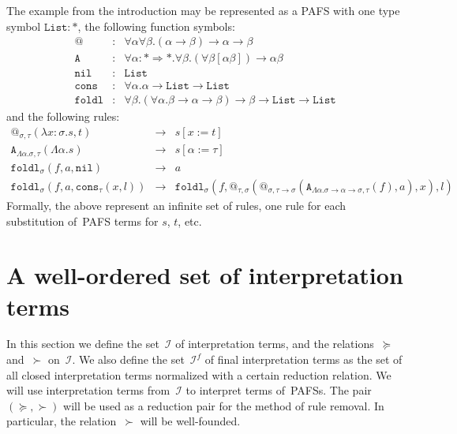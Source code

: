 \documentclass[a4paper,UKenglish,cleveref,autoref,numberwithinsect]{lipics-v2019}
\theoremstyle{definition}
\newcommand{\Iterms}{\mathcal{I}}
\newcommand{\arrkind}{\Rightarrow}
\newcommand{\arrtype}{\rightarrow}
\newcommand{\abs}[2]{\lambda #1.#2}
\newcommand{\tabs}[2]{\Lambda #1.#2}
\newcommand{\red}{\longrightarrow}
\newcommand{\List}{\mathtt{List}}
\newcommand{\nil}{\mathtt{nil}}
\newcommand{\cons}{\mathtt{cons}}
\begin{document}
\begin{example}\label{ex_fold_pafs}
  The example from the introduction may be represented as a PAFS with
  one type symbol $\mathtt{List} : *$, the following function symbols:
  \[
  \begin{array}{rcl}
    @ & : & \forall \alpha \forall \beta . (\alpha \arrtype \beta) \arrtype \alpha \arrtype \beta \\
    \mathtt{A} & : & \forall \alpha : * \arrkind * . \forall \beta .
    (\forall \beta [\alpha \beta]) \arrtype \alpha \beta \\
    \mathtt{nil} & : & \List \\
    \mathtt{cons} & : & \forall \alpha . \alpha \arrtype \List \arrtype \List \\
    \mathtt{foldl} & : & \forall \beta . (\forall \alpha . \beta \arrtype \alpha \arrtype \beta) \arrtype \beta \arrtype \List \arrtype \List
  \end{array}
  \]
  and the following rules:
  \[
  \begin{array}{rcl}
    @_{\sigma,\tau}(\abs{x:\sigma}{s},t) & \red & s[x:=t] \\
    \mathtt{A}_{\tabs{\alpha}{\sigma},\tau}(\tabs{\alpha}{s}) & \red &
    s[\alpha:=\tau] \\
    \mathtt{foldl}_\sigma(f,a,\nil) & \red & a \\
    \mathtt{foldl}_\sigma(f,a,\cons_\tau(x,l)) & \red & \mathtt{foldl}_\sigma(f,@_{\tau,\sigma}(@_{\sigma,\tau\arrtype\sigma}(\mathtt{A}_{\tabs{\alpha}{\sigma\arrtype\alpha\arrtype\sigma},\tau}(f),a),x),l)
  \end{array}
  \]
  Formally, the above represent an infinite set of rules, one rule for
  each substitution of~PAFS terms for $s$, $t$, etc.
\end{example}

\section{A well-ordered set of interpretation terms}

In this section we define the set~$\Iterms$ of interpretation terms,
and the relations~$\succeq$ and~$\succ$ on~$\Iterms$. We also define
the set~$\Iterms^f$ of final interpretation terms as the set of all
closed interpretation terms normalized with a certain reduction
relation. We will use interpretation terms from~$\Iterms$ to interpret
terms of~PAFSs. The pair $(\succeq,\succ)$ will be used as a reduction
pair for the method of rule removal. In particular, the
relation~$\succ$ will be well-founded.
\end{document}
